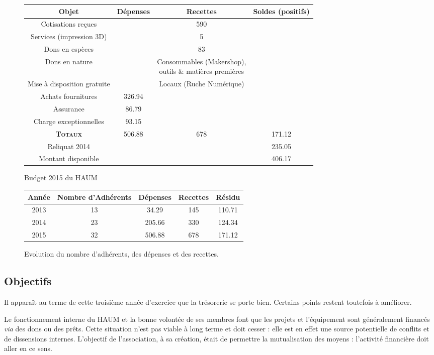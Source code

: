 \documentclass[11pt]{article}
\begin{document}
\begin{figure}[!ht]\centering
	\begin{tabular}{c|ccc}
		Objet & Dépenses & Recettes & Soldes (positifs)\\\hline
		Cotisations reçues & & 590 & \\
		Services (impression 3D) & & 5 & \\
		Dons en espèces & & 83 & \\
		Dons en nature & & \parbox[c]{5cm}{Consommables (Makershop),\\outils \& matières premières}  & \\
		Mise à disposition gratuite & & Locaux (Ruche Numérique) & \\\hline\hline
		Achats fournitures & 326.94 & & \\
		Assurance & 86.79 & & \\
		Charge exceptionnelles & 93.15 & & \\\hline\hline
		\textsc{\textbf{Totaux}} & 506.88 & 678 & 171.12\\\hline
		Reliquat 2014 & & & 235.05\\
		Montant disponible & & & 406.17
	\end{tabular}
	\caption{Budget 2015 du HAUM}
\end{figure}

\begin{figure}[!ht]\centering
\begin{tabular}{c|c|cc|c}
	Année & Nombre d'Adhérents & Dépenses & Recettes & Résidu\\\hline
	2013 & 13 & 34.29 & 145 & 110.71\\
	2014 & 23 & 205.66 & 330 & 124.34\\
	2015 & 32 & 506.88 & 678 & 171.12
\end{tabular}
\caption{Evolution du nombre d'adhérents, des dépenses et des recettes.}
\end{figure}

\subsection{Objectifs}

Il apparaît au terme de cette troisième année d'exercice que la trésorerie se porte bien. Certains points restent
toutefois à améliorer.

Le fonctionnement interne du HAUM et la bonne volontée de ses membres font que les projets et l'équipement sont
généralement financés \textit{via} des dons ou des prêts. Cette situation n'est pas viable à long terme et doit cesser :
elle est en effet une source potentielle de conflits et de dissensions internes. L'objectif de l'association, à sa
création, était de permettre la mutualisation des moyens : l'activité financière doit aller en ce sens.
\end{document}
